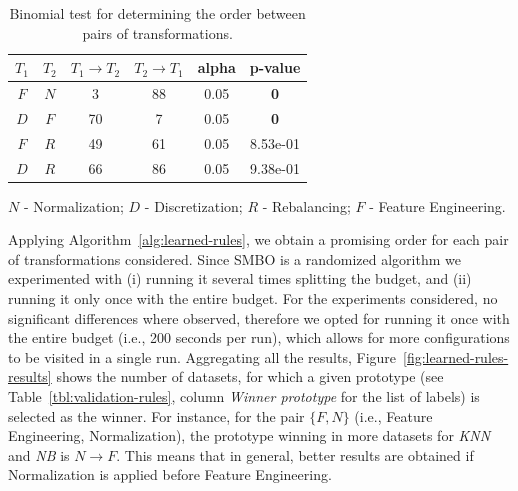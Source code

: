 \begin{example}
\begin{table}[t]
	\centering
	\footnotesize
	\begin{threeparttable}
		\caption{
			Binomial test for determining the order between pairs of transformations. 
		}
		\label{tbl:significance-test}
		\begin{tabular}{@{}cccccc@{}}
			\toprule
			$T_1$ & $T_2$ & $T_1 \rightarrow T_2$ & $T_2 \rightarrow T_1$ & alpha & p-value\\ \midrule
			$F$ & $N$ & 3 & 88 & 0.05 &  \textbf{0} \\
			$D$ & $F$ & 70 & 7 & 0.05 &  \textbf{0}  \\
			$F$ & $R$ & 49 & 61 & 0.05 & 8.53e-01 \\
			$D$ & $R$ & 66 & 86 & 0.05 & 9.38e-01 \\ \bottomrule
		\end{tabular}
		\begin{tablenotes}
		\centering
		\scriptsize
		\item$N$ - Normalization; $D$ - Discretization; $R$ - Rebalancing; $F$ - Feature Engineering. 
		\end{tablenotes}
	\end{threeparttable}
\end{table}
Applying Algorithm~\ref{alg:learned-rules}, we obtain a pro\-mising order for each pair of transformations considered. %
Since SMBO is a randomized algorithm we experimented with (i) running it several times splitting the budget, and (ii) running it only once with the entire budget. For the experiments considered, no significant differences where observed, therefore we opted for running it once with the entire budget (i.e., 200 seconds per run), which allows for more configurations to be visited in a single run. Aggregating all the results, Figure~\ref{fig:learned-rules-results} shows the number of datasets, for which a given prototype (see Table~\ref{tbl:validation-rules}, column \textit{Winner prototype} for the list of labels) is selected as the winner. For instance, for the pair $\{F,N\}$ (i.e., Feature Engineering, Normalization), the prototype winning in more datasets for \textit{KNN} and \textit{NB} is $N\rightarrow F$. This means that in general, better results are obtained if Normalization is applied before Feature Engineering. 


\end{example}

